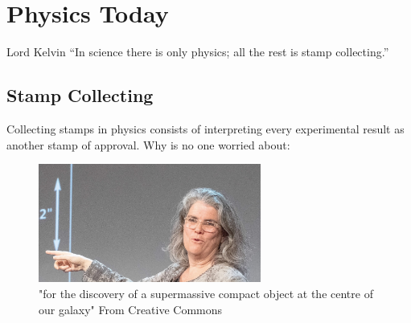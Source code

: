 \documentclass[../rzero]{subfiles}
\begin{document}
\chapter{Physics Today}\label{physicsTodayChapter}

\begin{chapquote}{Lord Kelvin}
``In science there is only physics; all the rest is stamp collecting.''
\end{chapquote}





\section{Stamp Collecting}
Collecting stamps in physics consists of interpreting every experimental result as another stamp of approval. Why is no one worried about:
\begin{figure}
\includegraphics[width=0.65\textwidth]{chapters/images/andrea-ghez.jpg}
\caption{"for the discovery of a supermassive compact object at the centre of our galaxy"   From\cite{borderlinerebelEnglishAndreaGhez2019} Creative Commons}
\label{andrea-ghez}
\end{figure}
\end{document}
